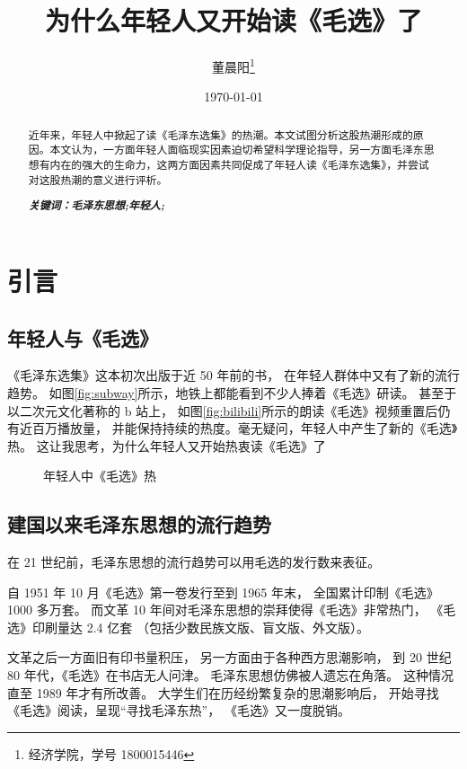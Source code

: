 \documentclass{ctexart}
\title{为什么年轻人又开始读《毛选》了}
\author{董晨阳\footnote{经济学院，学号 1800015446}}
\date{\today}
\begin{document}
\maketitle
\tableofcontents
\begin{abstract}
	近年来，年轻人中掀起了读《毛泽东选集》的热潮。本文试图分析这股热潮形成的原因。本文认为，一方面年轻人面临现实因素迫切希望科学理论指导，另一方面毛泽东思想有内在的强大的生命力，这两方面因素共同促成了年轻人读《毛泽东选集》，并尝试对这股热潮的意义进行评析。

	{\bf\emph{ 关键词：毛泽东思想;年轻人;  }\rm}
\end{abstract}
\newpage
\section{引言}
\subsection{年轻人与《毛选》}
《毛泽东选集》这本初次出版于近 50 年前的书，
在年轻人群体中又有了新的流行趋势。
如图\ref{fig:subway}所示，地铁上都能看到不少人捧着《毛选》研读。
甚至于以二次元文化著称的 b 站上，
如图\ref{fig:bilibili}所示的朗读《毛选》视频重置后仍有近百万播放量，
并能保持持续的热度。毫无疑问，年轻人中产生了新的《毛选》热。
这让我思考，为什么年轻人又开始热衷读《毛选》了
\begin{figure}
	\caption{年轻人中《毛选》热}
\end{figure}
\subsection{建国以来毛泽东思想的流行趋势}
在 21 世纪前，毛泽东思想的流行趋势可以用毛选的发行数来表征。

自 1951 年 10 月《毛选》第一卷发行至到 1965 年末，
全国累计印制《毛选》1000 多万套。
而文革 10 年间对毛泽东思想的崇拜使得《毛选》非常热门，
《毛选》印刷量达 2.4 亿套
（包括少数民族文版、盲文版、外文版）。

文革之后一方面旧有印书量积压，
另一方面由于各种西方思潮影响，
到 20 世纪 80 年代，《毛选》在书店无人问津。
毛泽东思想仿佛被人遗忘在角落。
这种情况直至 1989 年才有所改善。
大学生们在历经纷繁复杂的思潮影响后，
开始寻找《毛选》阅读，呈现“寻找毛泽东热”，
《毛选》又一度脱销。
\end{document}
